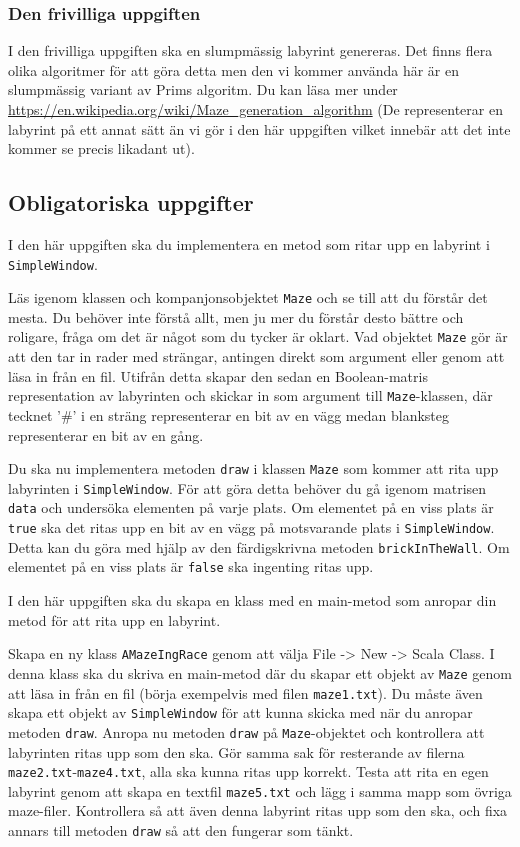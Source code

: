 \subsubsection{Den frivilliga uppgiften}

I den frivilliga uppgiften ska en slumpmässig labyrint genereras. Det finns flera olika algoritmer för att göra detta men den vi kommer använda här är en slumpmässig variant av Prims algoritm. Du kan läsa mer under \url{https://en.wikipedia.org/wiki/Maze\_generation\_algorithm} (De representerar en labyrint på ett annat sätt än vi gör i den här uppgiften vilket innebär att det inte kommer se precis likadant ut).


\subsection{Obligatoriska uppgifter}

\Task I den här uppgiften ska du implementera en metod som ritar upp en labyrint i \texttt{SimpleWindow}.

\Subtask Läs igenom klassen och kompanjonsobjektet \texttt{Maze} och se till att du förstår det mesta. Du behöver inte förstå allt, men ju mer du förstår desto bättre och roligare, fråga om det är något som du tycker är oklart. Vad objektet \texttt{Maze} gör är att den tar in rader med strängar, antingen direkt som argument eller genom att läsa in från en fil. Utifrån detta skapar den sedan en Boolean-matris representation av labyrinten och skickar in som argument till \texttt{Maze}-klassen, där tecknet '\#' i en sträng representerar en bit av en vägg medan blanksteg representerar en bit av en gång.

\Subtask Du ska nu implementera metoden \texttt{draw} i klassen \texttt{Maze} som kommer att rita upp labyrinten i \texttt{SimpleWindow}. För att göra detta behöver du gå igenom matrisen \texttt{data} och undersöka elementen på varje plats. Om elementet på en viss plats är \texttt{true} ska det ritas upp en bit av en vägg på motsvarande plats i \texttt{SimpleWindow}. Detta kan du göra med hjälp av den färdigskrivna metoden \texttt{brickInTheWall}. Om elementet på en viss plats är \texttt{false} ska ingenting ritas upp.


\Task I den här uppgiften ska du skapa en klass med en main-metod som anropar din metod för att rita upp en labyrint.

\Subtask Skapa en ny klass \texttt{AMazeIngRace} genom att välja File -> New -> Scala Class. I denna klass ska du skriva en main-metod där du skapar ett objekt av \texttt{Maze} genom att läsa in från en fil (börja exempelvis med filen \texttt{maze1.txt}). Du måste även skapa ett objekt av \texttt{SimpleWindow} för att kunna skicka med när du anropar metoden \texttt{draw}. Anropa nu metoden \texttt{draw} på \texttt{Maze}-objektet och kontrollera att labyrinten ritas upp som den ska. Gör samma sak för resterande av filerna \texttt{maze2.txt}-\texttt{maze4.txt}, alla ska kunna ritas upp korrekt. Testa att rita en egen labyrint genom att skapa en textfil \texttt{maze5.txt} och lägg i samma mapp som övriga maze-filer. Kontrollera så att även denna labyrint ritas upp som den ska, och fixa annars till metoden \texttt{draw} så att den fungerar som tänkt.


